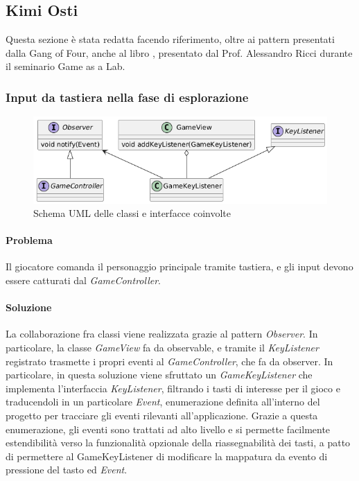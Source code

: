 \documentclass[a4paper,12pt]{report}
\begin{document}
\subsection{Kimi Osti}
Questa sezione è stata redatta facendo riferimento, oltre ai pattern presentati dalla Gang of Four, anche al libro \cite{nystrom2014}, presentato dal Prof. Alessandro Ricci durante il seminario Game as a Lab.

\subsubsection{Input da tastiera nella fase di esplorazione}
\begin{figure}[H]
	\centering
	\includegraphics[width=\textwidth]{img/observer-gameview.png}
	\caption{Schema UML delle classi e interfacce coinvolte}
	\label{img:observer-gameview}
\end{figure}
\paragraph{Problema} Il giocatore comanda il personaggio principale tramite tastiera, e gli input devono essere catturati dal \textit{GameController}.
\paragraph{Soluzione} La collaborazione fra classi viene realizzata grazie al pattern \textit{Observer}. In particolare, la classe \textit{GameView} fa da observable, e tramite il \textit{KeyListener} registrato trasmette i propri eventi al \textit{GameController}, che fa da observer. In particolare, in questa soluzione viene sfruttato un \textit{GameKeyListener} che implementa l'interfaccia \textit{KeyListener}, filtrando i tasti di interesse per il gioco e traducendoli in un particolare \textit{Event}, enumerazione definita all'interno del progetto per tracciare gli eventi rilevanti all'applicazione. Grazie a questa enumerazione, gli eventi sono trattati ad alto livello e si permette facilmente estendibilità verso la funzionalità opzionale della riassegnabilità dei tasti, a patto di permettere al GameKeyListener di modificare la mappatura da evento di pressione del tasto ed \textit{Event}.
\end{document}
